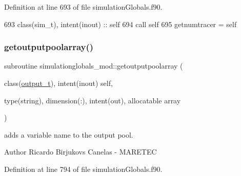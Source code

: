Definition at line 693 of file simulation\+Globals.\+f90.


\begin{DoxyCode}
693     \textcolor{keywordtype}{class}(sim\_t), \textcolor{keywordtype}{intent(inout)} :: self
694     \textcolor{keyword}{call }self%
695     getnumtracer = self%
\end{DoxyCode}
\mbox{\label{namespacesimulationglobals__mod_ac0323793c29be7c79a735ca766fb8a78}} 
\subsubsection{\texorpdfstring{getoutputpoolarray()}{getoutputpoolarray()}}
{\footnotesize\ttfamily subroutine simulationglobals\+\_\+mod\+::getoutputpoolarray (\begin{DoxyParamCaption}\item[{class(\mbox{\hyperlink{structsimulationglobals__mod_1_1output__t}{output\+\_\+t}}), intent(inout)}]{self,  }\item[{type(string), dimension(\+:), intent(out), allocatable}]{array }\end{DoxyParamCaption})\hspace{0.3cm}{\ttfamily [private]}}



adds a variable name to the output pool. 

\begin{DoxyAuthor}{Author}
Ricardo Birjukovs Canelas -\/ M\+A\+R\+E\+T\+EC 
\end{DoxyAuthor}


Definition at line 794 of file simulation\+Globals.\+f90.


